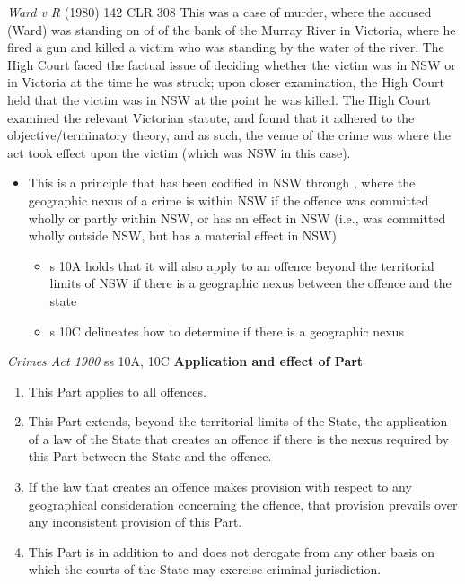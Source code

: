 \begin{casedetails}{\textit{Ward v R} (1980) 142 CLR 308}
    \flushleft
    This was a case of murder, where the accused (Ward) was standing on of of the bank of the Murray River in Victoria, where he fired a gun and killed a victim who was standing by the water of the river. The High Court faced the factual issue of deciding whether the victim was in NSW or in Victoria at the time he was struck; upon closer examination, the High Court held that the victim was in NSW at the point he was killed. The High Court examined the relevant Victorian statute, and found that it adhered to the objective/terminatory theory, and as such, the venue of the crime was where the act took effect upon the victim (which was NSW in this case).
\end{casedetails}

\begin{itemize}
    \item This is a principle that has been codified in NSW through , where the geographic nexus of a crime is within NSW if the offence was committed wholly or partly within NSW, or has an effect in NSW (i.e., was committed wholly outside NSW, but has a material effect in NSW)
    \begin{itemize}
        \item s 10A holds that it will also apply to an offence beyond the territorial limits of NSW if there is a geographic nexus between the offence and the state
        \item s 10C delineates how to determine if there is a geographic nexus
    \end{itemize}
\end{itemize}

\begin{statutedetails}{\textit{Crimes Act 1900} ss 10A, 10C}
    \flushleft
    \textbf{Application and effect of Part}
    \begin{enumerate}[label=(\arabic*)]
        \item This Part applies to all offences.
        \item This Part extends, beyond the territorial limits of the State, the application of a law of the State that creates an offence if there is the nexus required by this Part between the State and the offence.
        \item If the law that creates an offence makes provision with respect to any geographical consideration concerning the offence, that provision prevails over any inconsistent provision of this Part.
        \item This Part is in addition to and does not derogate from any other basis on which the courts of the State may exercise criminal jurisdiction.
    \end{enumerate}
\end{statutedetails}

